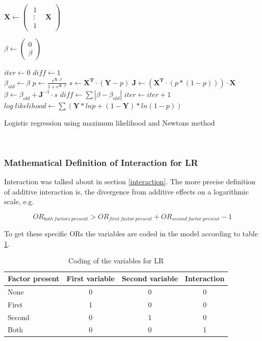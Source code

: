 \documentclass[10pt,a4paper]{report}
\newcounter{algorithmCode}
\begin{document}
\begin{algorithm}
\begin{algorithmic}
\State $\boldsymbol{X}\gets
\begin{pmatrix}
\begin{matrix}
  1\\
  \vdots\\
  1
\end{matrix} & \boldsymbol{X}
\end{pmatrix}
$

\State $\beta\gets
\begin{pmatrix}
  0\\
  \beta
\end{pmatrix}
$

\State $iter\gets 0$
\State $diff\gets 1$
\\
\State $\beta_{old}\gets\beta$
\State $p\gets \frac{e^{\boldsymbol{X} \cdot \beta}}{1+e^{\boldsymbol{X} \cdot \beta}}$
\State $s\gets \boldsymbol{X^T}\cdot (\boldsymbol{Y}-p)$
\State $\boldsymbol{J}\gets (\boldsymbol{X^T}\cdot (p*(1-p)))\cdot \boldsymbol{X}$
\State $\beta\gets \beta_{old}+\boldsymbol{J}^{-1} \cdot s$
\State $diff\gets \sum |\beta-\beta_{old}|$
\State $iter\gets iter+1$
\EndWhile
\State $log \; likelihood\gets \sum (\boldsymbol{Y}*ln p+(1-\boldsymbol{Y})*ln(1-p))$
\end{algorithmic}
  \caption{Logistic regression using maximum likelihood and Newtons method}
  \label{alg:lr}
\end{algorithm}

\newpage
$ $
\newpage
\subsubsection{Mathematical Definition of Interaction for LR}
\label{additive}
Interaction was talked about in section \ref{interaction}. The more precise definition of additive interaction is, the divergence from additive effects on a logarithmic scale, e.g\cite{rothman1998modern}.

\begin{equation}
OR_{both\:factors\:present}>OR_{first\:factor\:present}+OR_{second\:factor\:present}-1
\end{equation}

To get these specific ORs the variables are coded in the model according to table \ref{table:coding}\cite{uvehag_master_thesis}.

\begin{table}[h]
\begin{tabular}{| l | c c c|}
  \hline
  Factor present & First variable & Second variable & Interaction \\
  \hline
  None & 0 & 0 & 0 \\
  \hline 
  First & 1 & 0 & 0 \\
  \hline
  Second & 0 & 1 & 0 \\
  \hline
  Both & 0 & 0 & 1 \\
  \hline
\end{tabular}
\caption{Coding of the variables for LR}
\label{table:coding}
\end{table}
\end{document}
